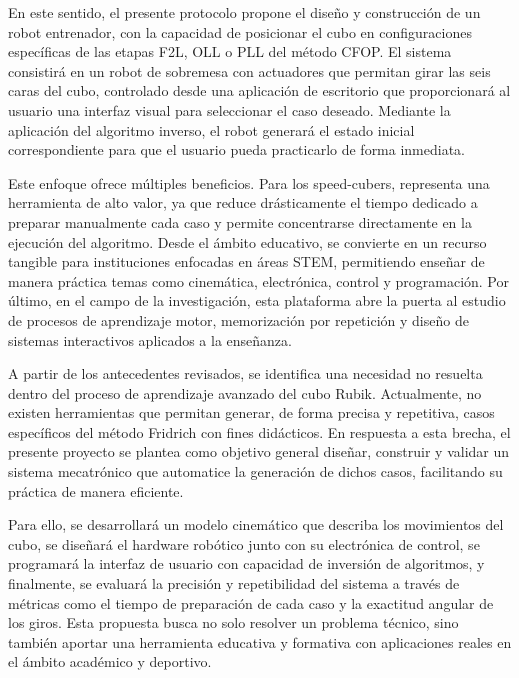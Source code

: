 En este sentido, el presente protocolo propone el diseño y construcción de un robot entrenador, con la capacidad de posicionar el cubo en configuraciones específicas de las etapas F2L, OLL o PLL del método CFOP. El sistema consistirá en un robot de sobremesa con actuadores que permitan girar las seis caras del cubo, controlado desde una aplicación de escritorio que proporcionará al usuario una interfaz visual para seleccionar el caso deseado. Mediante la aplicación del algoritmo inverso, el robot generará el estado inicial correspondiente para que el usuario pueda practicarlo de forma inmediata.

Este enfoque ofrece múltiples beneficios. Para los speed-cubers, representa una herramienta de alto valor, ya que reduce drásticamente el tiempo dedicado a preparar manualmente cada caso y permite concentrarse directamente en la ejecución del algoritmo. Desde el ámbito educativo, se convierte en un recurso tangible para instituciones enfocadas en áreas STEM, permitiendo enseñar de manera práctica temas como cinemática, electrónica, control y programación. Por último, en el campo de la investigación, esta plataforma abre la puerta al estudio de procesos de aprendizaje motor, memorización por repetición y diseño de sistemas interactivos aplicados a la enseñanza.

A partir de los antecedentes revisados, se identifica una necesidad no resuelta dentro del proceso de aprendizaje avanzado del cubo Rubik. Actualmente, no existen herramientas que permitan generar, de forma precisa y repetitiva, casos específicos del método Fridrich con fines didácticos. En respuesta a esta brecha, el presente proyecto se plantea como objetivo general diseñar, construir y validar un sistema mecatrónico que automatice la generación de dichos casos, facilitando su práctica de manera eficiente.

Para ello, se desarrollará un modelo cinemático que describa los movimientos del cubo, se diseñará el hardware robótico junto con su electrónica de control, se programará la interfaz de usuario con capacidad de inversión de algoritmos, y finalmente, se evaluará la precisión y repetibilidad del sistema a través de métricas como el tiempo de preparación de cada caso y la exactitud angular de los giros. Esta propuesta busca no solo resolver un problema técnico, sino también aportar una herramienta educativa y formativa con aplicaciones reales en el ámbito académico y deportivo.